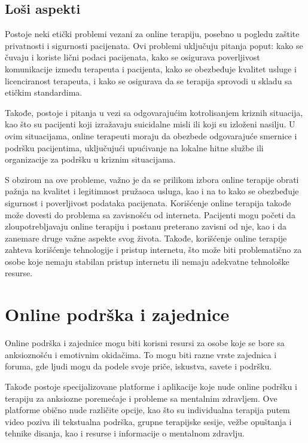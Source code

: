 \documentclass[a4paper]{article}
\begin{document}
\subsection{Loši aspekti}
Postoje neki etički problemi vezani za online terapiju, posebno u pogledu zaštite privatnosti i sigurnosti pacijenata. Ovi problemi uključuju pitanja poput: kako se čuvaju i koriste lični podaci pacijenata, kako se osigurava poverljivost komunikacije između terapeuta i pacijenta, kako se obezbeđuje kvalitet usluge i licenciranost terapeuta, i kako se osigurava da se terapija sprovodi u skladu sa etičkim standardima.

Takođe, postoje i pitanja u vezi sa odgovarajućim kotrolisanjem kriznih situacija, kao što su pacijenti koji izražavaju suicidalne misli ili koji su izloženi nasilju. U ovim situacijama, online terapeuti moraju da obezbede odgovarajuće smernice i podršku pacijentima, uključujući upućivanje na lokalne hitne službe ili organizacije za podršku u kriznim situacijama.

S obzirom na ove probleme, važno je da se prilikom izbora online terapije obrati pažnja na kvalitet i legitimnost pružaoca usluga, kao i na to kako se obezbeđuje sigurnost i poverljivost podataka pacijenata.
Korišćenje online terapija takođe može dovesti do problema sa zavisnošću od interneta. Pacijenti mogu početi da zloupotrebljavaju online terapiju i postanu preterano zavisni od nje, kao i da zanemare druge važne aspekte svog života. Takođe, korišćenje online terapije zahteva korišćenje tehnologije i pristup internetu, što može biti problematično za osobe koje nemaju stabilan pristup internetu ili nemaju adekvatne tehnološke resurse.

\section{Online podrška i zajednice}
\label{sec:onlajnPodrska}
Online podrška i zajednice mogu biti korisni resursi za osobe koje se bore sa anksioznošću i emotivnim okidačima. To mogu biti razne vrste zajednica i foruma, gde ljudi mogu da podele svoje priče, iskustva, savete i podršku.

Takođe postoje specijalizovane platforme i aplikacije koje nude online podršku i terapiju za anksiozne poremećaje i probleme sa mentalnim zdravljem. Ove platforme obično nude različite opcije, kao što su individualna terapija putem video poziva ili tekstualna podrška, grupne terapijske sesije, vežbe opuštanja i tehnike disanja, kao i resurse i informacije o mentalnom zdravlju.
\end{document}
